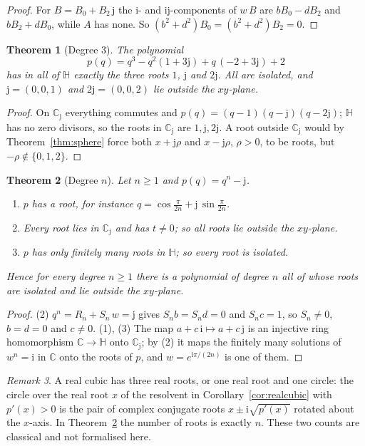 \documentclass[11pt,a4paper]{article}
\newcommand{\ii}{\mathrm{i}}
\newcommand{\jj}{\mathrm{j}}
\newcommand{\HH}{\mathbb{H}}
\newtheorem{theorem}{Theorem}
\theoremstyle{remark}
\newtheorem{remark}[theorem]{Remark}
\begin{document}
\begin{proof}
For $B=B_0+B_2\,\jj$ the $\ii$- and $\ii\jj$-components of $w\,B$ are $bB_0-dB_2$ and
$bB_2+dB_0$, while $A$ has none. So $(b^2+d^2)B_0=(b^2+d^2)B_2=0$.
\end{proof}

\begin{theorem}[Degree $3$]\label{thm:jcubic}
The polynomial
\[
  \boxed{\;p(q)=q^3-q^2(1+3\jj)+q\,(-2+3\jj)+2\;}
\]
has in all of $\HH$ exactly the three roots $1$, $\jj$ and $2\jj$. All are isolated, and
$\jj=(0,0,1)$ and $2\jj=(0,0,2)$ lie outside the $xy$-plane.
\end{theorem}

\begin{proof}
On $\mathbb{C}_{\jj}$ everything commutes and $p(q)=(q-1)(q-\jj)(q-2\jj)$; $\HH$ has no zero
divisors, so the roots in $\mathbb{C}_{\jj}$ are $1,\jj,2\jj$. A root outside $\mathbb{C}_{\jj}$
would by Theorem~\ref{thm:sphere} force both $x+\jj\rho$ and $x-\jj\rho$, $\rho>0$, to be
roots, but $-\rho\notin\{0,1,2\}$.
\end{proof}

\begin{theorem}[Degree $n$]\label{thm:jpow}
Let $n\ge1$ and $p(q)=q^n-\jj$.
\begin{enumerate}
  \item $p$ has a root, for instance $q=\cos\frac{\pi}{2n}+\jj\,\sin\frac{\pi}{2n}$.
  \item Every root lies in $\mathbb{C}_{\jj}$ and has $t\ne0$; so \emph{all} roots lie outside the
  $xy$-plane.
  \item $p$ has only finitely many roots in $\HH$; so every root is isolated.
\end{enumerate}
Hence for every degree $n\ge1$ there is a polynomial of degree $n$ all of whose roots are
isolated and lie outside the $xy$-plane.
\end{theorem}

\begin{proof}
(2) $q^n=R_n+S_n\,w=\jj$ gives $S_nb=S_nd=0$ and $S_nc=1$, so $S_n\ne0$, $b=d=0$ and
$c\ne0$. (1), (3) The map $a+c\,\ii\mapsto a+c\,\jj$ is an injective ring homomorphism
$\mathbb{C}\to\HH$ onto $\mathbb{C}_{\jj}$; by (2) it maps the finitely many solutions of
$w^n=\ii$ in $\mathbb{C}$ onto the roots of $p$, and $w=e^{\ii\pi/(2n)}$ is one of them.
\end{proof}

\begin{remark}
A real cubic has three real roots, or one real root and one circle: the circle over the real
root $x$ of the resolvent in Corollary~\ref{cor:realcubic} with $p'(x)>0$ is the pair of
complex conjugate roots $x\pm\ii\sqrt{p'(x)}$ rotated about the $x$-axis. In Theorem~\ref{thm:jpow}
the number of roots is exactly $n$. These two counts are classical and not formalised here.
\end{remark}
\end{document}
